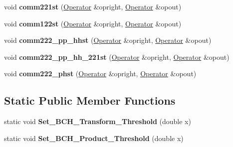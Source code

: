 \begin{DoxyCompactItemize}
\item 
\hypertarget{classOperator_a4d68427f2033c9e25c46674e555e05d2}{void {\bfseries comm221st} (\hyperlink{classOperator}{Operator} \&opright, \hyperlink{classOperator}{Operator} \&opout)}\label{classOperator_a4d68427f2033c9e25c46674e555e05d2}

\item 
\hypertarget{classOperator_ac7b9d8a707c3cfc953f070967704835e}{void {\bfseries comm122st} (\hyperlink{classOperator}{Operator} \&opright, \hyperlink{classOperator}{Operator} \&opout)}\label{classOperator_ac7b9d8a707c3cfc953f070967704835e}

\item 
\hypertarget{classOperator_a6b1dec40442bf3f9ebe0dbc52bc2d241}{void {\bfseries comm222\-\_\-pp\-\_\-hhst} (\hyperlink{classOperator}{Operator} \&opright, \hyperlink{classOperator}{Operator} \&opout)}\label{classOperator_a6b1dec40442bf3f9ebe0dbc52bc2d241}

\item 
\hypertarget{classOperator_a850ad8c78ae948a6243e6041eaee5b64}{void {\bfseries comm222\-\_\-pp\-\_\-hh\-\_\-221st} (\hyperlink{classOperator}{Operator} \&opright, \hyperlink{classOperator}{Operator} \&opout)}\label{classOperator_a850ad8c78ae948a6243e6041eaee5b64}

\item 
\hypertarget{classOperator_a0f3ee31f13fff9cb88e0e107e2acdf8a}{void {\bfseries comm222\-\_\-phst} (\hyperlink{classOperator}{Operator} \&opright, \hyperlink{classOperator}{Operator} \&opout)}\label{classOperator_a0f3ee31f13fff9cb88e0e107e2acdf8a}

\end{DoxyCompactItemize}
\subsection*{Static Public Member Functions}
\begin{DoxyCompactItemize}
\item 
\hypertarget{classOperator_a6f505221635444cb0b489b9ac600fd61}{static void {\bfseries Set\-\_\-\-B\-C\-H\-\_\-\-Transform\-\_\-\-Threshold} (double x)}\label{classOperator_a6f505221635444cb0b489b9ac600fd61}

\item 
\hypertarget{classOperator_a2c42843a1a557f2ab568d106e8fd23e8}{static void {\bfseries Set\-\_\-\-B\-C\-H\-\_\-\-Product\-\_\-\-Threshold} (double x)}\label{classOperator_a2c42843a1a557f2ab568d106e8fd23e8}

\end{DoxyCompactItemize}
